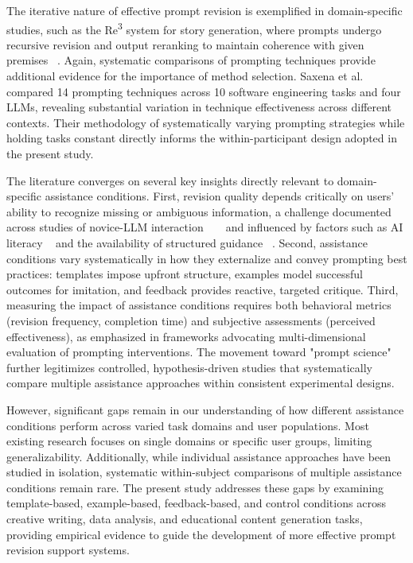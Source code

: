 The iterative nature of effective prompt revision is exemplified in domain-specific studies, such as the Re\textsuperscript{3} system for story generation, where prompts undergo recursive revision and output reranking to maintain coherence with given premises ~\cite{Yang2022Re3}. Again, systematic comparisons of prompting techniques provide additional evidence for the importance of method selection. Saxena et al. ~\cite{Knoth2024AI} compared 14 prompting techniques across 10 software engineering tasks and four LLMs, revealing substantial variation in technique effectiveness across different contexts. Their methodology of systematically varying prompting strategies while holding tasks constant directly informs the within-participant design adopted in the present study.


The literature converges on several key insights directly relevant to domain-specific assistance conditions. First, revision quality depends critically on users' ability to recognize missing or ambiguous information, a challenge documented across studies of novice-LLM interaction  ~\cite{Lucchetti2024Beginning} ~\cite{Yang2025Underspecified} and influenced by factors such as AI literacy ~\cite{Knoth2024AI} and the availability of structured guidance ~\cite{Khurana2024Why}. Second, assistance conditions vary systematically in how they externalize and convey prompting best practices: templates impose upfront structure, examples model successful outcomes for imitation, and feedback provides reactive, targeted critique. Third, measuring the impact of assistance conditions requires both behavioral metrics (revision frequency, completion time) and subjective assessments (perceived effectiveness), as emphasized in frameworks advocating multi-dimensional evaluation of prompting interventions. The movement toward "prompt science" ~\cite{Webson2025From} further legitimizes controlled, hypothesis-driven studies that systematically compare multiple assistance approaches within consistent experimental designs.


However, significant gaps remain in our understanding of how different assistance conditions perform across varied task domains and user populations. Most existing research focuses on single domains or specific user groups, limiting generalizability. Additionally, while individual assistance approaches have been studied in isolation, systematic within-subject comparisons of multiple assistance conditions remain rare. The present study addresses these gaps by examining template-based, example-based, feedback-based, and control conditions across creative writing, data analysis, and educational content generation tasks, providing empirical evidence to guide the development of more effective prompt revision support systems.